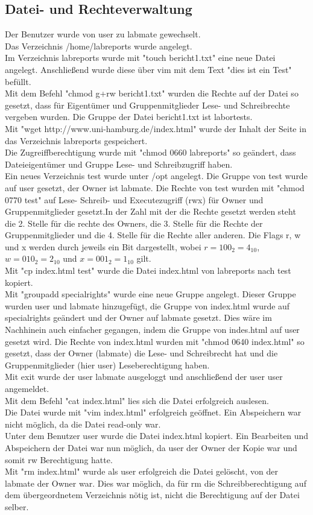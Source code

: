 \documentclass[12pt]{article}
\theoremstyle{plain}
\begin{document}
\begin{linenumbers}
\section{Datei- und Rechteverwaltung}
Der Benutzer wurde von user zu labmate gewechselt. \\
Das Verzeichnis /home/labreports wurde angelegt. \\
Im Verzeichnis labreports wurde mit "touch bericht1.txt" eine neue Datei angelegt. Anschließend wurde diese über vim mit dem Text "dies ist ein Test" befüllt.\\
Mit dem Befehl "chmod g+rw bericht1.txt" wurden die Rechte auf der Datei so gesetzt, dass für Eigentümer und Gruppenmitglieder Lese- und Schreibrechte vergeben wurden. Die Gruppe der Datei bericht1.txt ist labortests.\\
Mit "wget http://www.uni-hamburg.de/index.html" wurde der Inhalt der Seite in das Verzeichnis labreports gespeichert.\\
Die Zugreiffberechtigung wurde mit "chmod 0660 labreports" so geändert, dass Dateieigentümer und Gruppe Lese- und Schreibzugriff haben.\\
Ein neues Verzeichnis test wurde unter /opt angelegt. Die Gruppe von test wurde auf user gesetzt, der Owner ist labmate.
Die Rechte von test wurden mit "chmod 0770 test" auf Lese- Schreib- und Executezugriff (rwx) für Owner und Gruppenmitglieder gesetzt.In der Zahl mit der die Rechte gesetzt werden steht die 2. Stelle für die rechte des Owners, die 3. Stelle für die Rechte der Gruppenmitglieder und die 4. Stelle für die Rechte aller anderen. Die Flags r, w und x werden durch jeweils ein Bit dargestellt, wobei $r=100_2=4_{10}$, $w=010_2=2_{10}$ und $x=001_2=1_{10}$ gilt.\\
Mit "cp index.html test" wurde die Datei index.html von labreports nach test kopiert.\\
Mit "groupadd specialrights" wurde eine neue Gruppe angelegt. Dieser Gruppe wurden user und labmate hinzugefügt, die Gruppe von index.html wurde auf specialrights geändert und der Owner auf labmate gesetzt. Dies wäre im Nachhinein auch einfacher gegangen, indem die Gruppe von indes.html auf user gesetzt wird. Die Rechte von index.html wurden mit "chmod 0640 index.html" so gesetzt, dass der Owner (labmate) die Lese- und Schreibrecht hat und die Gruppenmitglieder (hier user) Leseberechtigung haben.\\
Mit exit wurde der user labmate ausgeloggt und anschließend der user user angemeldet.\\
Mit dem Befehl "cat index.html" lies sich die Datei erfolgreich auslesen.\\
Die Datei wurde mit "vim index.html" erfolgreich geöffnet. Ein Abspeichern war nicht möglich, da die Datei read-only war.\\
Unter dem Benutzer user wurde die Datei index.html kopiert. Ein Bearbeiten und Abspeichern der Datei war nun möglich, da user der Owner der Kopie war und somit rw Berechtigung hatte.\\
Mit "rm index.html" wurde als user erfolgreich die Datei gelöscht, von der labmate der Owner war. Dies war möglich, da für rm die Schreibberechtigung auf dem übergeordnetem Verzeichnis nötig ist, nicht die Berechtigung auf der Datei selber.

\end{linenumbers}
\end{document}
